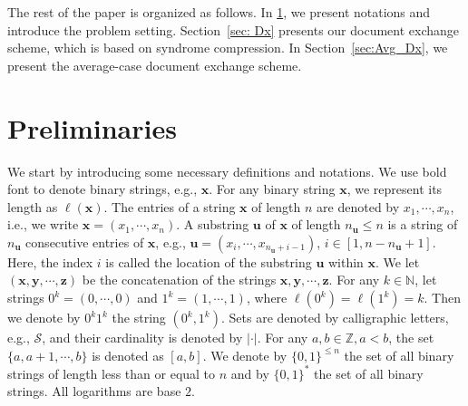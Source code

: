 \documentclass[onecolumn]{IEEEtran}
\newcommand{\length}[1]{{\ell}(#1)}
\newcommand{\bfu}{{\mathbf{ u}}}
\newcommand{\bfx}{{\mathbf{ x}}}
\newcommand{\cS}{\mathcal{S}}
\begin{document}
The rest of the paper is organized as follows. 
In \cref{sec:background}, we present notations and introduce the problem setting. Section~\ref{sec: Dx} presents our document exchange scheme, which is based on syndrome compression. In Section~\ref{sec:Avg_Dx}, we present the average-case document exchange scheme. %


\section{Preliminaries} \label{sec:background}

We start by introducing some necessary definitions and notations. We use bold font to denote binary strings, e.g., $\mathbf{x}$. For any binary string $\mathbf{x}$, we represent its length as $\length{\mathbf{x}}$. The entries of a string $\bfx$ of length $n$ are denoted by $x_1,\cdots,x_n$, i.e., we write $\bfx=(x_1,\cdots,x_n)$. A substring $\bfu$ of $\bfx$ of length $n_\bfu \leq n$ is a string of $n_\bfu$ consecutive entries of $\bfx$, e.g., $\bfu = (x_i, \cdots, x_{n_\bfu +i -1})$, $i\in [1,n-n_\bfu+1]$. Here, the index $i$ is called the location of the substring $\bfu$ within $\bfx$. We let $(\mathbf{x}, \mathbf{y}, \cdots, \mathbf{z})$ be the concatenation of the strings $\mathbf{x}, \mathbf{y}, \cdots, \mathbf{z}$. For any $k \in \mathbb{N}$, let strings $0^k = (0,\cdots,0)$ and $1^k = (1,\cdots,1)$, where $\length{0^k} = \length{1^k} = k$. Then we denote by $0^k1^k$ the string $(0^k,1^k)$. Sets are denoted by calligraphic letters, e.g., $\cS$, and their cardinality is denoted by $|\cdot|$. For any $a, b \in \mathbb{Z}, a < b$, the set $\{a, a+1, \cdots, b\}$ is denoted as $[a,b]$. We denote by $\{0,1\}^{\leq n}$ the set of all binary strings of length less than or equal to $n$ and by $\{0,1\}^*$ the set of all binary strings. All logarithms are base $2$.
\end{document}
